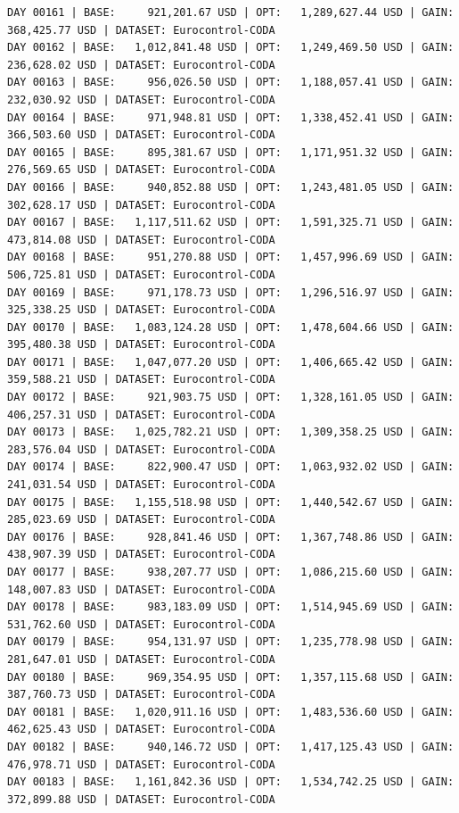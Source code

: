 \documentclass[11pt,a4paper]{article}
\begin{document}
\begin{verbatim}
DAY 00161 | BASE:     921,201.67 USD | OPT:   1,289,627.44 USD | GAIN: 368,425.77 USD | DATASET: Eurocontrol-CODA
DAY 00162 | BASE:   1,012,841.48 USD | OPT:   1,249,469.50 USD | GAIN: 236,628.02 USD | DATASET: Eurocontrol-CODA
DAY 00163 | BASE:     956,026.50 USD | OPT:   1,188,057.41 USD | GAIN: 232,030.92 USD | DATASET: Eurocontrol-CODA
DAY 00164 | BASE:     971,948.81 USD | OPT:   1,338,452.41 USD | GAIN: 366,503.60 USD | DATASET: Eurocontrol-CODA
DAY 00165 | BASE:     895,381.67 USD | OPT:   1,171,951.32 USD | GAIN: 276,569.65 USD | DATASET: Eurocontrol-CODA
DAY 00166 | BASE:     940,852.88 USD | OPT:   1,243,481.05 USD | GAIN: 302,628.17 USD | DATASET: Eurocontrol-CODA
DAY 00167 | BASE:   1,117,511.62 USD | OPT:   1,591,325.71 USD | GAIN: 473,814.08 USD | DATASET: Eurocontrol-CODA
DAY 00168 | BASE:     951,270.88 USD | OPT:   1,457,996.69 USD | GAIN: 506,725.81 USD | DATASET: Eurocontrol-CODA
DAY 00169 | BASE:     971,178.73 USD | OPT:   1,296,516.97 USD | GAIN: 325,338.25 USD | DATASET: Eurocontrol-CODA
DAY 00170 | BASE:   1,083,124.28 USD | OPT:   1,478,604.66 USD | GAIN: 395,480.38 USD | DATASET: Eurocontrol-CODA
DAY 00171 | BASE:   1,047,077.20 USD | OPT:   1,406,665.42 USD | GAIN: 359,588.21 USD | DATASET: Eurocontrol-CODA
DAY 00172 | BASE:     921,903.75 USD | OPT:   1,328,161.05 USD | GAIN: 406,257.31 USD | DATASET: Eurocontrol-CODA
DAY 00173 | BASE:   1,025,782.21 USD | OPT:   1,309,358.25 USD | GAIN: 283,576.04 USD | DATASET: Eurocontrol-CODA
DAY 00174 | BASE:     822,900.47 USD | OPT:   1,063,932.02 USD | GAIN: 241,031.54 USD | DATASET: Eurocontrol-CODA
DAY 00175 | BASE:   1,155,518.98 USD | OPT:   1,440,542.67 USD | GAIN: 285,023.69 USD | DATASET: Eurocontrol-CODA
DAY 00176 | BASE:     928,841.46 USD | OPT:   1,367,748.86 USD | GAIN: 438,907.39 USD | DATASET: Eurocontrol-CODA
DAY 00177 | BASE:     938,207.77 USD | OPT:   1,086,215.60 USD | GAIN: 148,007.83 USD | DATASET: Eurocontrol-CODA
DAY 00178 | BASE:     983,183.09 USD | OPT:   1,514,945.69 USD | GAIN: 531,762.60 USD | DATASET: Eurocontrol-CODA
DAY 00179 | BASE:     954,131.97 USD | OPT:   1,235,778.98 USD | GAIN: 281,647.01 USD | DATASET: Eurocontrol-CODA
DAY 00180 | BASE:     969,354.95 USD | OPT:   1,357,115.68 USD | GAIN: 387,760.73 USD | DATASET: Eurocontrol-CODA
DAY 00181 | BASE:   1,020,911.16 USD | OPT:   1,483,536.60 USD | GAIN: 462,625.43 USD | DATASET: Eurocontrol-CODA
DAY 00182 | BASE:     940,146.72 USD | OPT:   1,417,125.43 USD | GAIN: 476,978.71 USD | DATASET: Eurocontrol-CODA
DAY 00183 | BASE:   1,161,842.36 USD | OPT:   1,534,742.25 USD | GAIN: 372,899.88 USD | DATASET: Eurocontrol-CODA

\end{verbatim}
\end{document}

